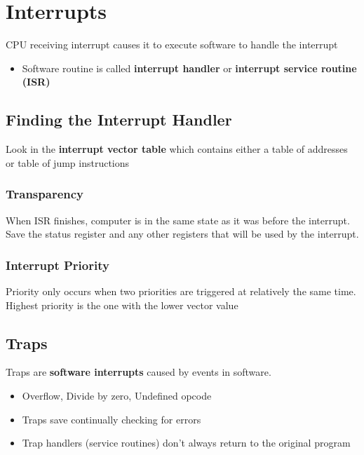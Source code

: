 \section{Interrupts}
CPU receiving interrupt causes it to execute software to handle the interrupt
\begin{itemize}
	\item Software routine is called \textbf{interrupt handler} or \textbf{interrupt service routine (ISR)}
\end{itemize}

\subsection{Finding the Interrupt Handler}
Look in the \textbf{interrupt vector table} which contains either a table of addresses or table of jump instructions

\subsubsection{Transparency}
When ISR finishes, computer is in the same state as it was before the interrupt. Save the status register and any other registers that will be used by the interrupt.

\subsubsection{Interrupt Priority}
Priority only occurs when two priorities are triggered at relatively the same time. Highest priority is the one with the lower vector value

\subsection{Traps}
Traps are \textbf{software interrupts} caused by events in software.
\begin{itemize}
	\item Overflow, Divide by zero, Undefined opcode
	\item Traps save continually checking for errors
	\item Trap handlers (service routines) don't always return to the original program
\end{itemize}
